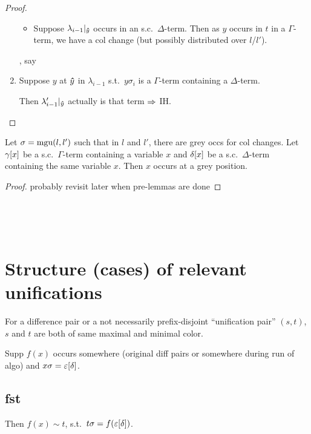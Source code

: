 \documentclass[,%
	paper=a4,%
	DIV11, %
	twoside=false,%
	liststotoc,
	bibtotoc,
	draft=false,%
	numbers=noendperiod
]{scrartcl}
\begin{document}
\begin{proof}
\begin{enumerate}
\begin{itemize}
				\item
					Suppose $\lambda_{i-1}|_{\bm\hat y}$ occurs in an s.c.\ $\Delta$-term.
					Then as $y$ occurs in $t$ in a $\Gamma$-term, we have a col change (but possibly distributed over $l$/$l'$).
			\end{itemize}

			, say
		\item
			Suppose $y$ at $\bm\hat y$ in $\lambda_{i-1}$ s.t.\ $y\sigma_i$ is a $\Gamma$-term containing a $\Delta$-term.

			Then $\lambda'_{i-1}|_{\bm\hat y}$ actually is that term $\Rightarrow$ IH. 
	\end{enumerate}
\end{proof}

\begin{clemma}
	Let $\sigma = \operatorname{mgu}(l, l')$ such that in $l$ and $l'$, there are grey occs for col changes.
	Let $\gamma[x]$ be a s.c.\ $\Gamma$-term containing a variable $x$ and $\delta[x]$ be a s.c.\ $\Delta$-term containing the same variable $x$.
	Then $x$ occurs at a grey position.
\end{clemma}
\begin{proof}
	probably revisit later when pre-lemmas are done

\end{proof}

~

~



\section{Structure (cases) of relevant unifications} 

\begin{lemma}
	For a difference pair or a not necessarily prefix-disjoint ``unification pair'' $(s, t)$, $s$ and $t$ are both of same maximal and minimal color.
\end{lemma}

Supp $f(x)$ occurs somewhere (original diff pairs or somewhere during run of algo) and $x\sigma =\nolinebreak \varepsilon\occ{\delta}$.



\subsection{fst}

Then $f(x) \sim t$, s.t.\ $t\sigma = f(\varepsilon[\delta])$.
\end{document}
